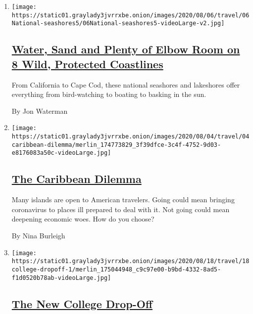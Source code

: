 \begin{enumerate}
\def\labelenumi{\arabic{enumi}.}
\item
  \texttt{[image: https://static01.graylady3jvrrxbe.onion/images/2020/08/06/travel/06National-seashores5/06National-seashores5-videoLarge-v2.jpg]}

  \hypertarget{water-sand-and-plenty-of-elbow-room-on-8-wild-protected-coastlines}{%
  \subsection{\texorpdfstring{\href{/2020/08/06/travel/National-Seashores.html}{Water,
  Sand and Plenty of Elbow Room on 8 Wild, Protected
  Coastlines}}{Water, Sand and Plenty of Elbow Room on 8 Wild, Protected Coastlines}}\label{water-sand-and-plenty-of-elbow-room-on-8-wild-protected-coastlines}}

  From California to Cape Cod, these national seashores and lakeshores
  offer everything from bird-watching to boating to basking in the sun.

  By Jon Waterman
\item
  \texttt{[image: https://static01.graylady3jvrrxbe.onion/images/2020/08/04/travel/04caribbean-dilemma/merlin\_174773829\_3f39dfce-3c4f-4752-9d03-e8176083a50c-videoLarge.jpg]}

  \hypertarget{the-caribbean-dilemma}{%
  \subsection{\texorpdfstring{\href{/2020/08/04/travel/coronavirus-caribbean-vacations.html}{The
  Caribbean
  Dilemma}}{The Caribbean Dilemma}}\label{the-caribbean-dilemma}}

  Many islands are open to American travelers. Going could mean bringing
  coronavirus to places ill prepared to deal with it. Not going could
  mean deepening economic woes. How do you choose?

  By Nina Burleigh
\item
  \texttt{[image: https://static01.graylady3jvrrxbe.onion/images/2020/08/18/travel/18college-dropoff-1/merlin\_175044948\_c9c97e00-b9bd-4332-8ad5-f1d0520b78ab-videoLarge.jpg]}

  \hypertarget{the-new-college-drop-off}{%
  \subsection{\texorpdfstring{\href{/2020/07/29/travel/virus-college-travel-restrictions.html}{The
  New College
  Drop-Off}}{The New College Drop-Off}}\label{the-new-college-drop-off}}


\end{enumerate}
